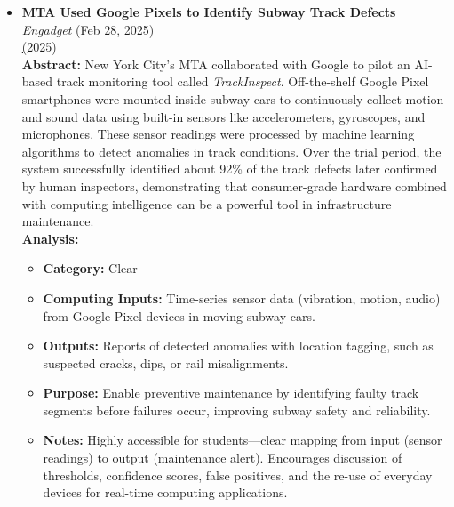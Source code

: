 \documentclass[11pt]{article}
\begin{document}
\begin{itemize}
\item \textbf{MTA Used Google Pixels to Identify Subway Track Defects} \\
\textit{Engadget} (Feb 28, 2025)\\
\href{https://technews.acm.org/archives.cfm?fo=2025-02-feb#35} (2025)\\
\textbf{Abstract:} New York City’s MTA collaborated with Google to pilot an AI-based track monitoring tool called \textit{TrackInspect}. Off-the-shelf Google Pixel smartphones were mounted inside subway cars to continuously collect motion and sound data using built-in sensors like accelerometers, gyroscopes, and microphones. These sensor readings were processed by machine learning algorithms to detect anomalies in track conditions. Over the trial period, the system successfully identified about 92\% of the track defects later confirmed by human inspectors, demonstrating that consumer-grade hardware combined with computing intelligence can be a powerful tool in infrastructure maintenance.\\
\textbf{Analysis:}
\begin{itemize}
\item \textbf{Category:} Clear
\item \textbf{Computing Inputs:} Time-series sensor data (vibration, motion, audio) from Google Pixel devices in moving subway cars.
\item \textbf{Outputs:} Reports of detected anomalies with location tagging, such as suspected cracks, dips, or rail misalignments.
\item \textbf{Purpose:} Enable preventive maintenance by identifying faulty track segments before failures occur, improving subway safety and reliability.
\item \textbf{Notes:} Highly accessible for students—clear mapping from input (sensor readings) to output (maintenance alert). Encourages discussion of thresholds, confidence scores, false positives, and the re-use of everyday devices for real-time computing applications.
\end{itemize}


\end{itemize}
\end{document}
